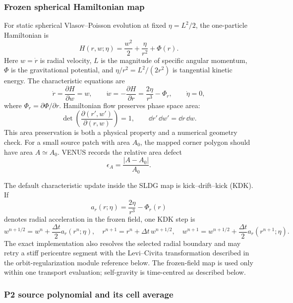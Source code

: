 \subsubsection{Frozen spherical Hamiltonian map}

For static spherical Vlasov--Poisson evolution at fixed
\(\eta=L^2/2\), the one-particle Hamiltonian is
\[
 H(r,w;\eta)
 =\frac{w^2}{2}+\frac{\eta}{r^2}+\Phi(r).
\]
Here \(w=\dot r\) is radial velocity, \(L\) is the magnitude of specific
angular momentum, \(\Phi\) is the gravitational potential, and
\(\eta/r^2=L^2/(2r^2)\) is tangential kinetic energy.  The characteristic
equations are
\[
 \dot r = \frac{\partial H}{\partial w}=w,
 \qquad
 \dot w =-\frac{\partial H}{\partial r}
 =\frac{2\eta}{r^3}-\Phi_r,
 \qquad
 \dot\eta=0,
\]
where \(\Phi_r=\partial\Phi/\partial r\).  Hamiltonian flow preserves
phase space area:
\[
 \det\!\left(\frac{\partial(r',w')}{\partial(r,w)}\right)=1,
 \qquad
 \dd r'\,\dd w'=\dd r\,\dd w .
\]
This area preservation is both a physical property and a numerical geometry
check.  For a small source patch with area \(A_0\), the mapped corner polygon
should have area \(A\simeq A_0\).  VENUS records the relative area defect
\[
 \epsilon_A=\frac{|A-A_0|}{A_0}.
\]

The default characteristic update inside the SLDG map is
kick--drift--kick (KDK).  If
\[
 a_r(r;\eta) = \frac{2\eta}{r^3}-\Phi_r(r)
\]
denotes radial acceleration in the frozen field, one KDK step is
\[
 w^{n+1/2}=w^n+\frac{\Delta t}{2}a_r(r^n;\eta),
\quad
 r^{n+1}=r^n+\Delta t\,w^{n+1/2},
\quad
 w^{n+1}=w^{n+1/2}
 +\frac{\Delta t}{2}a_r(r^{n+1};\eta).
\]
The exact implementation also resolves the selected radial boundary and may
retry a stiff pericentre segment with the Levi--Civita transformation described
in the orbit-regularization module reference below.  The frozen-field map is used
only within one transport evaluation; self-gravity is time-centred as
described below.

\subsubsection{P2 source polynomial and its cell average}

